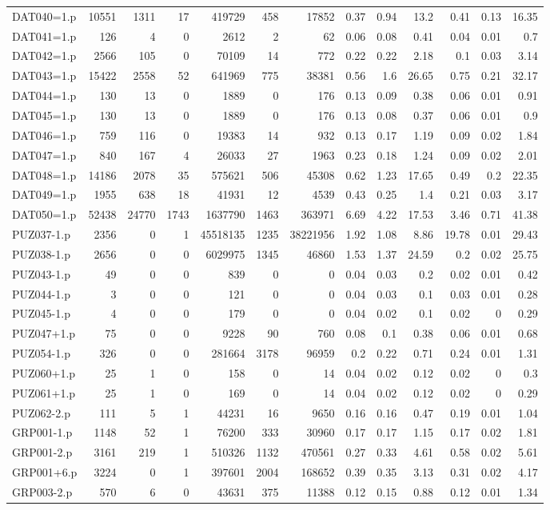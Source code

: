 \begin{table}[H]
\begin{adjustwidth}{-0.4in}{-0.5in}
\begin{tabular}{| l || r | r | r || r | r | r || r | r | r | r | r | r |}
DAT040=1.p&10551&1311&17&419729&458&17852&0.37&0.94&13.2&0.41&0.13&16.35\\
DAT041=1.p&126&4&0&2612&2&62&0.06&0.08&0.41&0.04&0.01&0.7\\
DAT042=1.p&2566&105&0&70109&14&772&0.22&0.22&2.18&0.1&0.03&3.14\\
DAT043=1.p&15422&2558&52&641969&775&38381&0.56&1.6&26.65&0.75&0.21&32.17\\
DAT044=1.p&130&13&0&1889&0&176&0.13&0.09&0.38&0.06&0.01&0.91\\
DAT045=1.p&130&13&0&1889&0&176&0.13&0.08&0.37&0.06&0.01&0.9\\
DAT046=1.p&759&116&0&19383&14&932&0.13&0.17&1.19&0.09&0.02&1.84\\
DAT047=1.p&840&167&4&26033&27&1963&0.23&0.18&1.24&0.09&0.02&2.01\\
DAT048=1.p&14186&2078&35&575621&506&45308&0.62&1.23&17.65&0.49&0.2&22.35\\
DAT049=1.p&1955&638&18&41931&12&4539&0.43&0.25&1.4&0.21&0.03&3.17\\
DAT050=1.p&52438&24770&1743&1637790&1463&363971&6.69&4.22&17.53&3.46&0.71&41.38\\
PUZ037-1.p&2356&0&1&45518135&1235&38221956&1.92&1.08&8.86&19.78&0.01&29.43\\
PUZ038-1.p&2656&0&0&6029975&1345&46860&1.53&1.37&24.59&0.2&0.02&25.75\\
PUZ043-1.p&49&0&0&839&0&0&0.04&0.03&0.2&0.02&0.01&0.42\\
PUZ044-1.p&3&0&0&121&0&0&0.04&0.03&0.1&0.03&0.01&0.28\\
PUZ045-1.p&4&0&0&179&0&0&0.04&0.02&0.1&0.02&0&0.29\\
PUZ047+1.p&75&0&0&9228&90&760&0.08&0.1&0.38&0.06&0.01&0.68\\
PUZ054-1.p&326&0&0&281664&3178&96959&0.2&0.22&0.71&0.24&0.01&1.31\\
PUZ060+1.p&25&1&0&158&0&14&0.04&0.02&0.12&0.02&0&0.3\\
PUZ061+1.p&25&1&0&169&0&14&0.04&0.02&0.12&0.02&0&0.29\\
PUZ062-2.p&111&5&1&44231&16&9650&0.16&0.16&0.47&0.19&0.01&1.04\\
GRP001-1.p&1148&52&1&76200&333&30960&0.17&0.17&1.15&0.17&0.02&1.81\\
GRP001-2.p&3161&219&1&510326&1132&470561&0.27&0.33&4.61&0.58&0.02&5.61\\
GRP001+6.p&3224&0&1&397601&2004&168652&0.39&0.35&3.13&0.31&0.02&4.17\\
GRP003-2.p&570&6&0&43631&375&11388&0.12&0.15&0.88&0.12&0.01&1.34\\

\end{tabular}
\end{adjustwidth}
\end{table}
